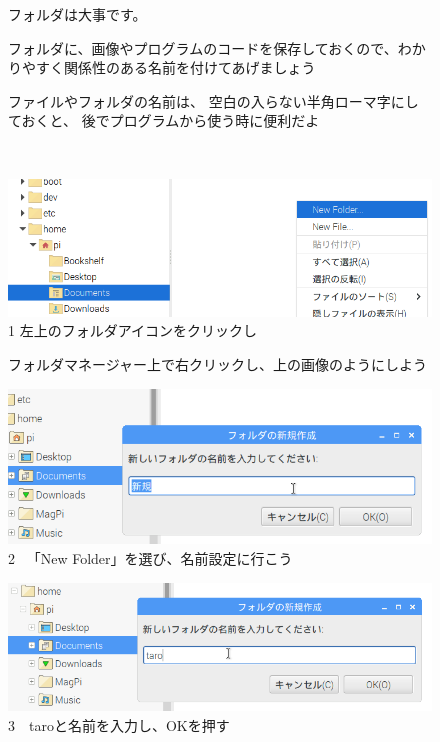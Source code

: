 \documentclass[a4paper,12pt]{jarticle}
\begin{document}
\begin{figure}[hb]
  \centering
  \begin{minipage}{0.9\textwidth}
    {	\large
      フォルダは大事です。

      フォルダに、画像やプログラムのコードを保存しておくので、わかりやすく関係性のある名前を付けてあげましょう

      \bigskip
      ファイルやフォルダの名前は、
      空白の入らない半角ローマ字にしておくと、
      後でプログラムから使う時に便利だよ
    }
  \end{minipage}
\end{figure}
\clearpage
\begin{figure}[ht]
  \vspace{8mm}\\
  \centering
  \begin{minipage}{0.9\textwidth}
   \includegraphics[width=\linewidth]{textbook-img034.png}
    1
    左上のフォルダアイコンをクリックし

    フォルダマネージャー上で右クリックし、上の画像のようにしよう
  \end{minipage}
  \vfill

  \centering
  \begin{minipage}{0.9\textwidth}
   \includegraphics[width=\linewidth]{textbook-img036.png}
    2
    \ 「New Folder」を選び、名前設定に行こう
  \end{minipage}
  \vfill

  \centering
  \begin{minipage}{0.9\textwidth}
  \includegraphics[width=\linewidth]{textbook-img039.png}
    3　taroと名前を入力し、OKを押す
  \end{minipage}
  \vfill


\end{figure}
\end{document}
